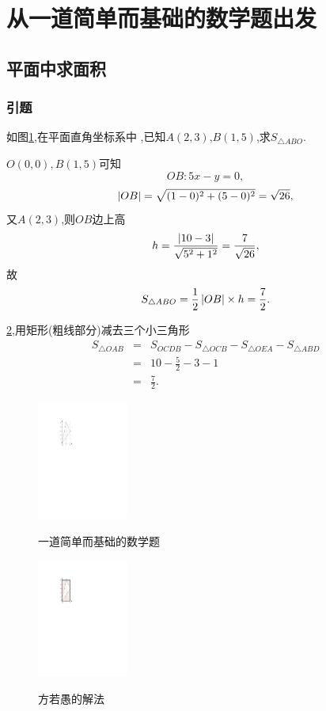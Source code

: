 \section{从一道简单而基础的数学题出发}
\subsection{平面中求面积}
\subsubsection{引题}

  \prob 如图\ref{pro1},在平面直角坐标系中
  ,已知$A(2,3)$,$B(1,5)$,求$S_{\triangle ABO}$.

  $O(0,0),B(1,5)$可知
  $$OB:5x-y=0,$$
  $$\left| {OB} \right|=\sqrt{(1-0)^2+(5-0)^2}=\sqrt{26},$$
  又$A(2,3)$,则$OB$边上高
  $$h=\frac{\left| {10-3} \right|}{\sqrt{5^2+1^2}}=\frac{7}{\sqrt{26}},$$
  故
  $$S_{\triangle ABO}=\frac{1}{2}\left| {OB} \right|\times h=\frac{7}{2}.$$
\solend

\ref{pro2},用矩形(粗线部分)减去三个小三角形
\begin{eqnarray}
S_{\triangle OAB}
&=&S_{OCDB}-S_{\triangle OCB}-
S_{\triangle OEA}-S_{\triangle ABD} \nonumber\\
&=&10-\frac{5}{2}-3-1\nonumber\\
&=&\frac{7}{2}.\nonumber
\end{eqnarray}
\solend

\begin{figure}
  \centering
  \includegraphics[width=3cm]{pic//1//1.pdf}\\
  \caption{一道简单而基础的数学题}\label{pro1}
\end{figure}

\begin{figure}
  \centering
  \includegraphics[width=3cm]{pic//1//2.pdf}\\
  \caption{方若愚的解法}\label{pro2}
\end{figure}

